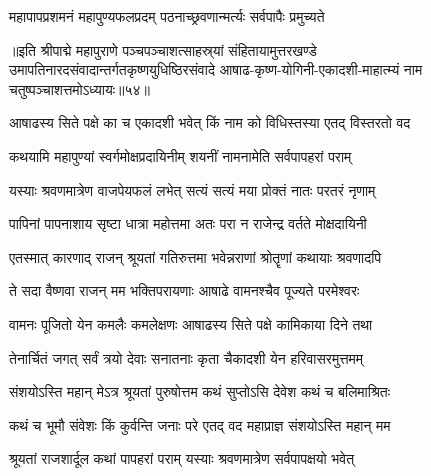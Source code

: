 \twolineshloka
{महापापप्रशमनं महापुण्यफलप्रदम्}
{पठनाच्छ्रवणान्मर्त्यः सर्वपापैः प्रमुच्यते}%

॥इति श्रीपाद्मे महापुराणे पञ्चपञ्चाशत्साहस्र्यां संहितायामुत्तरखण्डे उमापतिनारदसंवादान्तर्गतकृष्णयुधिष्ठिरसंवादे आषाढ-कृष्ण-योगिनी-एकादशी-माहात्म्यं नाम चतुष्पञ्चाशत्तमोऽध्यायः॥५४॥

\genMangalaShloka

\hyperref[sec:ekadashi_mahatmyam_padma_puranam]{\closesub}
\clearpage

\label{sec:padma-ashadha-shukla-shayani}

\ganapatyadiDhyanam
\padmaPuranam



\twolineshloka
{आषाढस्य सिते पक्षे का च एकादशी भवेत्}
{किं नाम को विधिस्तस्या एतद् विस्तरतो वद}%


\twolineshloka
{कथयामि महापुण्यां स्वर्गमोक्षप्रदायिनीम्}
{शयनीं नामनामेति सर्वपापहरां पराम्}%

\twolineshloka
{यस्याः श्रवणमात्रेण वाजपेयफलं लभेत्}
{सत्यं सत्यं मया प्रोक्तं नातः परतरं नृणाम्}%

\twolineshloka
{पापिनां पापनाशाय सृष्टा धात्रा महोत्तमा}
{अतः परा न राजेन्द्र वर्तते मोक्षदायिनी}%

\twolineshloka
{एतस्मात् कारणाद् राजन् श्रूयतां गतिरुत्तमा}
{भवेन्नराणां श्रोतॄणां कथायाः श्रवणादपि}%

\twolineshloka
{ते सदा वैष्णवा राजन् मम भक्तिपरायणाः}
{आषाढे वामनश्चैव पूज्यते परमेश्वरः}%

\twolineshloka
{वामनः पूजितो येन कमलैः कमलेक्षणः}
{आषाढस्य सिते पक्षे कामिकाया दिने तथा}%

\twolineshloka
{तेनार्चितं जगत् सर्वं त्रयो देवाः सनातनाः}
{कृता चैकादशी येन हरिवासरमुत्तमम्}%


\twolineshloka
{संशयोऽस्ति महान् मेऽत्र श्रूयतां पुरुषोत्तम}
{कथं सुप्तोऽसि देवेश कथं च बलिमाश्रितः}%

\twolineshloka
{कथं च भूमौ संवेशः किं कुर्वन्ति जनाः परे}
{एतद् वद महाप्राज्ञ संशयोऽस्ति महान् मम}%


\twolineshloka
{श्रूयतां राजशार्दूल कथां पापहरां पराम्}
{यस्याः श्रवणमात्रेण सर्वपापक्षयो भवेत्}%

